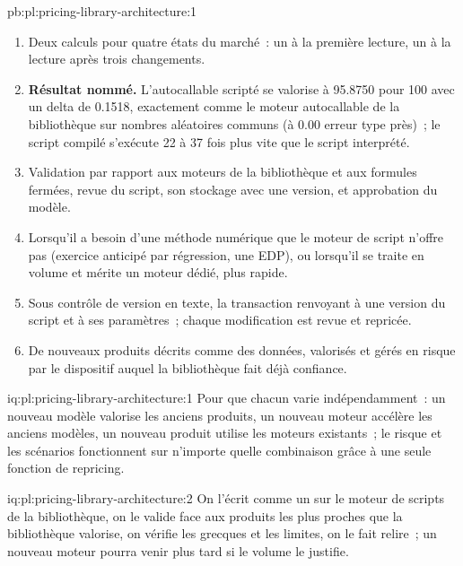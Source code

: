 \begin{solution}{pb:pl:pricing-library-architecture:1}
\begin{enumerate}
\item Deux calculs pour quatre états du marché~: un à la première lecture, un à la lecture après trois changements.
\item \textbf{Résultat nommé.} L'autocallable scripté se valorise à 95.8750 pour 100 avec un delta de 0.1518, exactement comme le moteur autocallable de la bibliothèque
sur nombres aléatoires communs (à 0.00 erreur type près)~; le script compilé s'exécute 22 à 37 fois plus vite que le script interprété.
\item Validation par rapport aux moteurs de la bibliothèque et aux formules fermées, revue du script, son stockage avec une version, et approbation du modèle.
\item Lorsqu'il a besoin d'une méthode numérique que le moteur de script n'offre pas (exercice anticipé par régression, une EDP), ou lorsqu'il se traite en volume
et mérite un moteur dédié, plus rapide.
\item Sous contrôle de version en texte, la transaction renvoyant à une version du script et à ses paramètres~; chaque modification est revue et repricée.
\item De nouveaux produits décrits comme des données, valorisés et gérés en risque par le dispositif auquel la bibliothèque fait déjà confiance.
\end{enumerate}
\end{solution}

\begin{solution}{iq:pl:pricing-library-architecture:1}
Pour que chacun varie indépendamment~: un nouveau modèle valorise les anciens produits, un nouveau moteur accélère les anciens modèles, un nouveau produit utilise les moteurs existants~;
le risque et les scénarios fonctionnent sur n'importe quelle combinaison grâce à une seule fonction de repricing.
\end{solution}

\begin{solution}{iq:pl:pricing-library-architecture:2}
On l'écrit comme un  sur le moteur de scripts de la bibliothèque, on le valide face aux produits les plus proches que la bibliothèque valorise, on vérifie les grecques et
les limites, on le fait relire~; un nouveau moteur pourra venir plus tard si le volume le justifie.
\end{solution}

